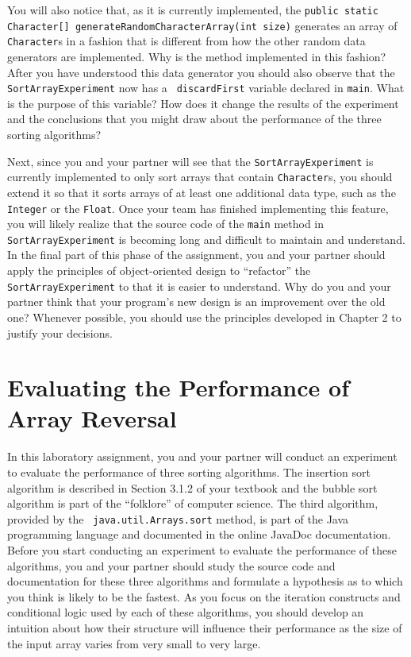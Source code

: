 You will also notice that, as it is currently implemented, the {\tt public static Character[]
generateRandomCharacterArray(int size)} generates an array of {\tt Character}s in a fashion that is different from how
the other random data generators are implemented. Why is the method implemented in this fashion? After you have
understood this data generator you should also observe that the {\tt SortArrayExperiment} now has a {\tt
discardFirst} variable declared in {\tt main}. What is the purpose of this variable? How does it change the results of
the experiment and the conclusions that you might draw about the performance of the three sorting algorithms?

Next, since you and your partner will see that the {\tt SortArrayExperiment} is currently implemented to only sort
arrays that contain {\tt Character}s, you should extend it so that it sorts arrays of at least one additional data type,
such as the {\tt Integer} or the {\tt Float}. Once your team has finished implementing this feature, you will likely
realize that the source code of the {\tt main} method in {\tt SortArrayExperiment} is becoming long and difficult to
maintain and understand. In the final part of this phase of the assignment, you and your partner should apply the
principles of object-oriented design to ``refactor'' the {\tt SortArrayExperiment} to that it is easier to
understand. Why do you and your partner think that your program's new design is an improvement over the old one?
Whenever possible, you should use the principles developed in Chapter 2 to justify your decisions.

\section*{Evaluating the Performance of Array Reversal}

In this laboratory assignment, you and your partner will conduct an experiment to evaluate the performance of three
sorting algorithms. The insertion sort algorithm is described in Section 3.1.2 of your textbook and the bubble sort
algorithm is part of the ``folklore'' of computer science. The third algorithm, provided by the {\tt
java.util.Arrays.sort} method, is part of the Java programming language and documented in the online JavaDoc
documentation. Before you start conducting an experiment to evaluate the performance of these algorithms, you and your
partner should study the source code and documentation for these three algorithms and formulate a hypothesis as to which
you think is likely to be the fastest. As you focus on the iteration constructs and conditional logic used by each of
these algorithms, you should develop an intuition about how their structure will influence their performance as the size
of the input array varies from very small to very large.

